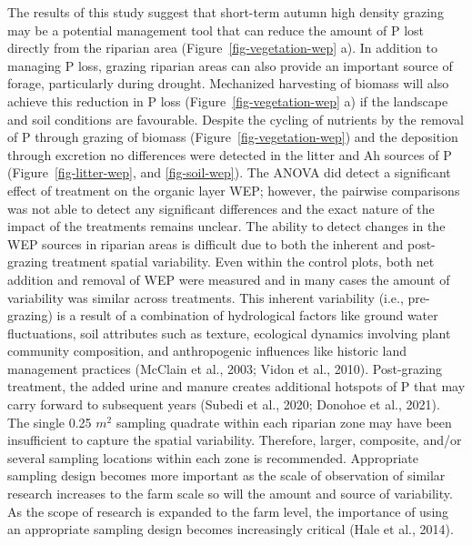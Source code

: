 \documentclass[
]{agujournal2019}
\begin{document}
The results of this study suggest that short-term autumn high density
grazing may be a potential management tool that can reduce the amount of
P lost directly from the riparian area (Figure~\ref{fig-vegetation-wep}
a). In addition to managing P loss, grazing riparian areas can also
provide an important source of forage, particularly during drought.
Mechanized harvesting of biomass will also achieve this reduction in P
loss (Figure~\ref{fig-vegetation-wep} a) if the landscape and soil
conditions are favourable. Despite the cycling of nutrients by the
removal of P through grazing of biomass
(Figure~\ref{fig-vegetation-wep}) and the deposition through excretion
no differences were detected in the litter and Ah sources of P
(Figure~\ref{fig-litter-wep}, and \ref{fig-soil-wep}). The ANOVA did
detect a significant effect of treatment on the organic layer WEP;
however, the pairwise comparisons was not able to detect any significant
differences and the exact nature of the impact of the treatments remains
unclear. The ability to detect changes in the WEP sources in riparian
areas is difficult due to both the inherent and post-grazing treatment
spatial variability. Even within the control plots, both net addition
and removal of WEP were measured and in many cases the amount of
variability was similar across treatments. This inherent variability
(i.e., pre-grazing) is a result of a combination of hydrological factors
like ground water fluctuations, soil attributes such as texture,
ecological dynamics involving plant community composition, and
anthropogenic influences like historic land management practices
(McClain et al., 2003; Vidon et al., 2010). Post-grazing treatment, the
added urine and manure creates additional hotspots of P that may carry
forward to subsequent years (Subedi et al., 2020; Donohoe et al., 2021).
The single 0.25 \(m^2\) sampling quadrate within each riparian zone may
have been insufficient to capture the spatial variability. Therefore,
larger, composite, and/or several sampling locations within each zone is
recommended. Appropriate sampling design becomes more important as the
scale of observation of similar research increases to the farm scale so
will the amount and source of variability. As the scope of research is
expanded to the farm level, the importance of using an appropriate
sampling design becomes increasingly critical (Hale et al., 2014).
\end{document}
